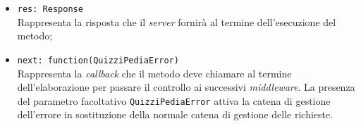 \begin{itemize}
\begin{itemize}
\begin{itemize}
			\item \texttt{res: Response}\\
			Rappresenta la risposta che il \textit{server} fornirà al termine dell'esecuzione del metodo;
			\item \texttt{next: function(QuizziPediaError)}\\
			Rappresenta la \textit{callback} che il metodo deve chiamare al termine dell'elaborazione per passare il controllo ai successivi \textit{middleware}. La presenza del parametro facoltativo \texttt{QuizziPediaError} attiva la catena di gestione dell'errore in sostituzione della normale catena di gestione delle richieste.
		\end{itemize}
	\end{itemize}
\end{itemize}
